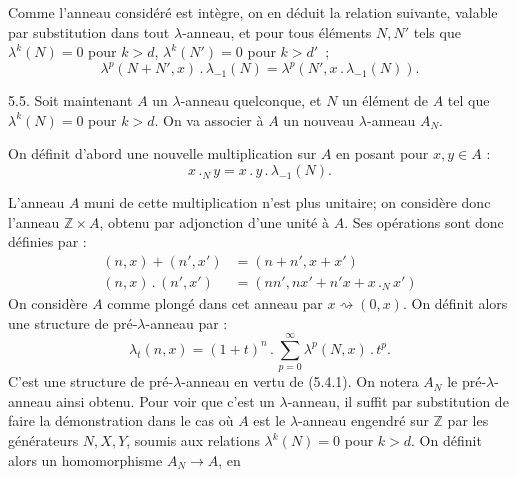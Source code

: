 

Comme l'anneau considéré est intègre, on en déduit la relation suivante, valable par substitution dans tout \(\lambda\)-anneau, et pour tous éléments \(N,N'\) tels que \(\lambda^k(N)=0\) pour \(k>d\), \(\lambda^k(N')=0\) pour \(k>d'\)~;
\begin{equation}\tag{5.4.2}
  \lambda^p(N+N',x)\mathbin{.}\lambda_{-1}(N)=\lambda^p(N',x\mathbin{.}\lambda_{-1}(N)).
\end{equation}


5.5. Soit maintenant \(A\) un \(\lambda\)-anneau quelconque, et \(N\) un élément de \(A\) tel que \(\lambda^k(N)=0\) pour \(k>d\). On va associer à \(A\) un nouveau \(\lambda\)-anneau \(A_N\).

On définit d'abord une nouvelle multiplication sur \(A\) en posant pour \(x,y\in A\) :
\begin{equation}\tag{5.5.1}
  x\mathbin{.}_N y=x\mathbin{.} y\mathbin{.}\lambda_{-1}(N).
\end{equation}

L'anneau \(A\) muni de cette multiplication n'est plus unitaire; on considère donc l'anneau \(\mathbb Z\times A\), obtenu par adjonction d'une unité à \(A\). Ses opérations sont donc définies par :
\begin{equation}\tag{5.5.2}
\begin{aligned}
  (n,x)+(n',x')&=(n+n',x+x')\\
  (n,x)\mathbin{.}(n',x')&=(nn',nx'+n'x+x\mathbin{.}_N x')
\end{aligned}
\end{equation}
On considère \(A\) comme plongé dans cet anneau par \(x\rightsquigarrow(0,x)\). On définit alors une structure de pré-\(\lambda\)-anneau par :
\begin{equation}\tag{5.5.3}
  \lambda_t(n,x)=(1+t)^n\mathbin{.}\sum_{p=0}^{\infty}\lambda^p(N,x)\mathbin{.} t^p.
\end{equation}
C'est une structure de pré-\(\lambda\)-anneau en vertu de (5.4.1). On notera \(A_N\) le pré-\(\lambda\)-anneau ainsi obtenu. Pour voir que c'est un \(\lambda\)-anneau, il suffit par substitution de faire la démonstration dans le cas où \(A\) est le \(\lambda\)-anneau engendré sur \(\mathbb Z\) par les générateurs \(N,X,Y\), soumis aux relations \(\lambda^k(N)=0\) pour \(k>d\). On définit alors un homomorphisme \(A_N\to A\), en
